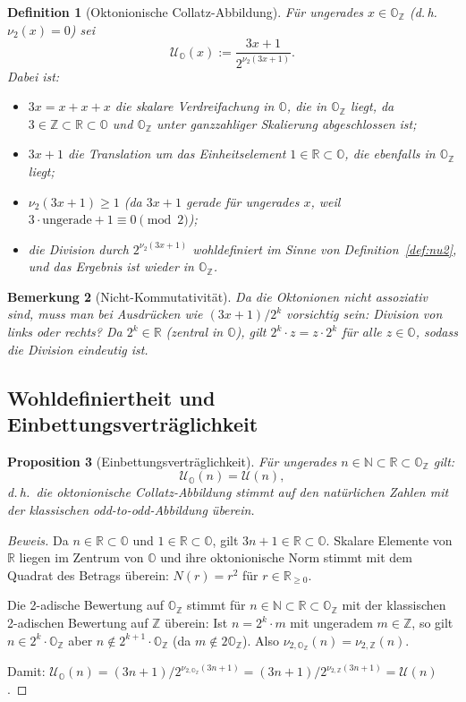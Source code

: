 \documentclass[12pt,a4paper]{article}
\newtheorem{definition}{Definition}[section]
\newtheorem{proposition}[definition]{Proposition}
\newtheorem{bemerkung}[definition]{Bemerkung}
\newenvironment{beweis}{\begin{proof}[Beweis]}{\end{proof}}
\newcommand{\vii}{\nu_2}           %
\newcommand{\U}{\mathcal{U}}       %
\newcommand{\OZ}{\mathbb{O}_{\mathbb{Z}}}  %
\newcommand{\OO}{\mathbb{O}}       %
\newcommand{\Norm}[1]{N(#1)}       %
\newcommand{\N}{\mathbb{N}}
\newcommand{\Z}{\mathbb{Z}}
\newcommand{\R}{\mathbb{R}}
\newcommand{\Uo}{\mathcal{U}_{\mathbb{O}}} %
\begin{document}
\begin{definition}[Oktonionische Collatz-Abbildung]\label{def:Uo}
Für ungerades $x \in \OZ$ (d.\,h.\ $\vii(x) = 0$) sei
\[
  \Uo(x) := \frac{3x + 1}{2^{\vii(3x+1)}}.
\]
Dabei ist:
\begin{itemize}
  \item $3x = x + x + x$ die skalare Verdreifachung in $\OO$,
    die in $\OZ$ liegt, da $3 \in \Z \subset \R \subset \OO$ und
    $\OZ$ unter ganzzahliger Skalierung abgeschlossen ist;
  \item $3x + 1$ die Translation um das Einheitselement $1 \in \R \subset \OO$,
    die ebenfalls in $\OZ$ liegt;
  \item $\vii(3x+1) \geq 1$ (da $3x+1$ gerade für ungerades $x$,
    weil $3 \cdot \text{ungerade} + 1 \equiv 0 \pmod 2$);
  \item die Division durch $2^{\vii(3x+1)}$ wohldefiniert im Sinne von
    Definition~\ref{def:nu2}, und das Ergebnis ist wieder in $\OZ$.
\end{itemize}
\end{definition}

\begin{bemerkung}[Nicht-Kommutativität]
Da die Oktonionen nicht assoziativ sind, muss man bei Ausdrücken
wie $(3x+1)/2^k$ vorsichtig sein: Division von links oder rechts?
Da $2^k \in \R$ (zentral in $\OO$), gilt $2^k \cdot z = z \cdot 2^k$
für alle $z \in \OO$, sodass die Division eindeutig ist.
\end{bemerkung}

\subsection{Wohldefiniertheit und Einbettungsverträglichkeit}

\begin{proposition}[Einbettungsverträglichkeit]\label{prop:einbettung}
Für ungerades $n \in \N \subset \R \subset \OZ$ gilt:
\[
  \Uo(n) = \U(n),
\]
d.\,h.\ die oktonionische Collatz-Abbildung stimmt auf den natürlichen
Zahlen mit der klassischen odd-to-odd-Abbildung überein.
\end{proposition}

\begin{beweis}
Da $n \in \R \subset \OO$ und $1 \in \R \subset \OO$, gilt
$3n + 1 \in \R \subset \OO$. Skalare Elemente von $\R$ liegen im Zentrum
von $\OO$ und ihre oktonionische Norm stimmt mit dem Quadrat des Betrags
überein: $\Norm{r} = r^2$ für $r \in \R_{\geq 0}$.

Die 2-adische Bewertung auf $\OZ$ stimmt für $n \in \N \subset \R \subset \OZ$
mit der klassischen 2-adischen Bewertung auf $\Z$ überein:
Ist $n = 2^k \cdot m$ mit ungeradem $m \in \Z$, so gilt $n \in 2^k \cdot \OZ$
aber $n \notin 2^{k+1} \cdot \OZ$ (da $m \notin 2\OZ$).
Also $\nu_{2,\OZ}(n) = \nu_{2,\Z}(n)$.

Damit: $\Uo(n) = (3n+1)/2^{\nu_{2,\OZ}(3n+1)} = (3n+1)/2^{\nu_{2,\Z}(3n+1)} = \U(n)$.
\end{beweis}
\end{document}

